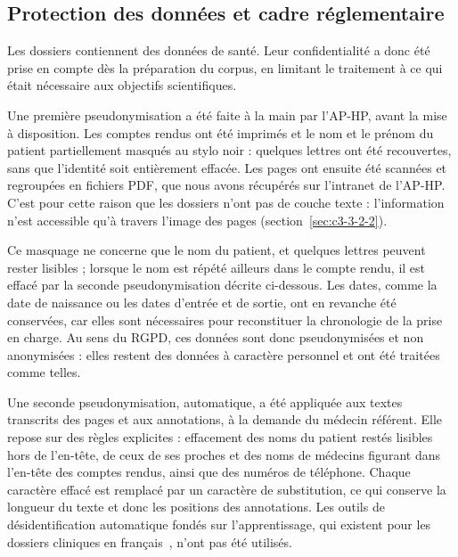 \subsection{Protection des données et cadre réglementaire}\label{sec:c3-3-2-4}

Les dossiers contiennent des données de santé. Leur confidentialité a donc été prise en compte dès la préparation du corpus, en limitant le traitement à ce qui était nécessaire aux objectifs scientifiques.

Une première pseudonymisation a été faite à la main par l'AP-HP, avant la mise à disposition. Les comptes rendus ont été imprimés et le nom et le prénom du patient partiellement masqués au stylo noir : quelques lettres ont été recouvertes, sans que l'identité soit entièrement effacée. Les pages ont ensuite été scannées et regroupées en fichiers PDF, que nous avons récupérés sur l'intranet de l'AP-HP. C'est pour cette raison que les dossiers n'ont pas de couche texte : l'information n'est accessible qu'à travers l'image des pages (section~\ref{sec:c3-3-2-2}).

Ce masquage ne concerne que le nom du patient, et quelques lettres peuvent rester lisibles ; lorsque le nom est répété ailleurs dans le compte rendu, il est effacé par la seconde pseudonymisation décrite ci-dessous. Les dates, comme la date de naissance ou les dates d'entrée et de sortie, ont en revanche été conservées, car elles sont nécessaires pour reconstituer la chronologie de la prise en charge. Au sens du RGPD, ces données sont donc pseudonymisées et non anonymisées : elles restent des données à caractère personnel et ont été traitées comme telles.

Une seconde pseudonymisation, automatique, a été appliquée aux textes transcrits des pages et aux annotations, à la demande du médecin référent. Elle repose sur des règles explicites : effacement des noms du patient restés lisibles hors de l'en-tête, de ceux de ses proches et des noms de médecins figurant dans l'en-tête des comptes rendus, ainsi que des numéros de téléphone. Chaque caractère effacé est remplacé par un caractère de substitution, ce qui conserve la longueur du texte et donc les positions des annotations. Les outils de désidentification automatique fondés sur l'apprentissage, qui existent pour les dossiers cliniques en français~\cite{elazzouzi2024}, n'ont pas été utilisés.

